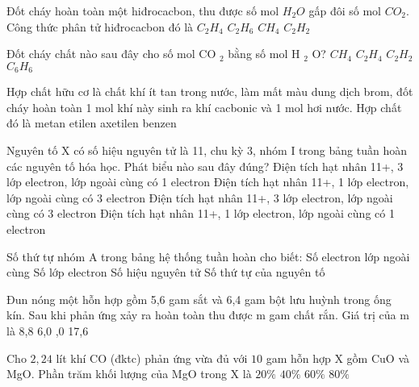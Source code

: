 \begin{ex}
	Đốt cháy hoàn toàn một hiđrocacbon, thu được số mol  $H_2O$  gấp đôi số mol  $CO_2$. Công thức phân tử hiđrocacbon đó là
	\choice
	{ $C_2H_4$}
	{ $C_2H_6$}
	{\True  $CH_4$}
	{ $C_2H_2$}
	\loigiai{}
\end{ex}
\begin{ex}
	Đốt cháy chất nào sau đây cho số mol CO $_2$ bằng số mol H $_2$ O?
	\choice
	{$CH_4$}
	{\True $C_2H_4$}
	{$C_2H_2$}
	{$C_6H_6$}
	\loigiai{}
\end{ex}
\begin{ex}
	Hợp chất hữu cơ là chất khí ít tan trong nước, làm mất màu dung dịch brom, đốt cháy hoàn toàn 1 mol khí này sinh ra khí cacbonic và 1 mol hơi nước. Hợp chất đó là
	\choice
	{metan}
	{etilen}
	{\True axetilen}
	{benzen}
	\loigiai{}
\end{ex}
\begin{ex}
	Nguyên tố X có số hiệu nguyên tử là 11, chu kỳ 3, nhóm I trong bảng tuần hoàn các nguyên tố hóa học. Phát biểu nào sau đây đúng?
	\choice
	{\True Điện tích hạt nhân 11+, 3 lớp electron, lớp ngoài cùng có 1 electron}
	{Điện tích hạt nhân 11+, 1 lớp electron, lớp ngoài cùng có 3 electron}
	{Điện tích hạt nhân 11+, 3 lớp electron, lớp ngoài cùng có 3 electron}
	{Điện tích hạt nhân 11+, 1 lớp electron, lớp ngoài cùng có 1 electron}
	\loigiai{}
\end{ex}
\begin{ex}
	Số thứ tự nhóm A trong bảng hệ thống tuần hoàn cho biết:
	\choice
	{\True Số electron lớp ngoài cùng}
	{Số lớp electron}
	{Số hiệu nguyên tử}
	{Số thứ tự của nguyên tố}
	\loigiai{}
\end{ex}
\begin{ex}
	Đun nóng một hỗn hợp gồm 5,6 gam sắt và 6,4 gam bột lưu huỳnh trong ống kín. Sau khi phản ứng xảy ra hoàn toàn thu được m gam chất rắn. Giá trị của m là
	\choice
	{8,8}
	{6,0}
	{,0}
	{17,6}
	\loigiai{}
\end{ex}
\begin{ex}
	Cho $2{,}24$ lít khí CO (đktc) phản ứng vừa đủ với $10$ gam hỗn hợp X gồm CuO và MgO. Phần trăm khối lượng của MgO trong X là
	\choice
	{\True $20\%$}
	{$40\%$}
	{$60\%$}
	{$80\%$}
	\loigiai{}
\end{ex}

